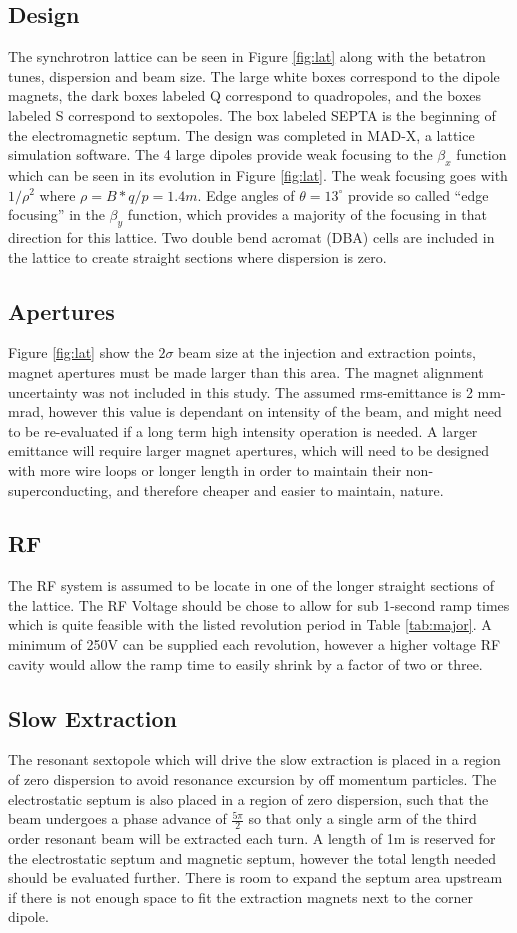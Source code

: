\subsection{Design}
The synchrotron lattice can be seen in Figure \ref{fig:lat} along with the betatron tunes, dispersion and beam size.  The large white boxes correspond to the dipole
magnets, the dark boxes labeled Q correspond to quadropoles, and the boxes labeled S correspond to sextopoles.  The box labeled SEPTA is the beginning of the 
electromagnetic septum.  The design was completed in MAD-X, a lattice simulation software.  The 4 large dipoles provide weak focusing to the $\beta_x$ function which 
can be seen in its evolution in Figure \ref{fig:lat}.  The weak focusing goes with $1/\rho^2$ where $\rho = B * q/p = 1.4m$.  Edge angles of $\theta = 13^\circ$ provide
so called ``edge focusing'' in the $\beta_y$ function, which provides a majority of the focusing in that direction for this lattice. Two double bend acromat (DBA) cells
are included in the lattice to create straight  sections where dispersion is zero.  
\subsection{Apertures} 
Figure \ref{fig:lat} show the $2\sigma$ beam size at the injection and extraction points, magnet apertures must be made larger than this area.  The magnet alignment
uncertainty was not included in this study. The assumed rms-emittance is 2 mm-mrad, however this value is dependant on intensity of the beam, and might need to 
be re-evaluated if a long term high intensity operation is needed.  A larger emittance will require larger magnet apertures, which will need to be designed with
more wire loops or longer length in order to maintain their non-superconducting, and therefore cheaper and easier to maintain, nature.  
\subsection{RF}
The RF system is assumed to be locate in one of the longer straight sections of the lattice.  The RF Voltage should be chose to allow for sub 1-second ramp times which
is quite feasible with the listed revolution period in Table \ref{tab:major}.  A minimum of 250V can be supplied each revolution, however a higher voltage RF cavity 
would allow the ramp time to easily shrink by a factor of two or three. 
\subsection{Slow Extraction}
The resonant sextopole which will drive the slow extraction is placed in a region of zero dispersion to avoid resonance excursion by off momentum particles.  The 
electrostatic septum is also placed in a region of zero dispersion, such that the beam undergoes a phase advance of $\frac{5\pi}{2}$ so that only a single arm of
the third order resonant beam will be extracted each turn.  A length of 1m is reserved for the electrostatic septum and magnetic septum, however the total length
needed should be evaluated further.  There is room to expand the septum area upstream if there is not enough space to fit the extraction magnets next to the 
corner dipole.  

